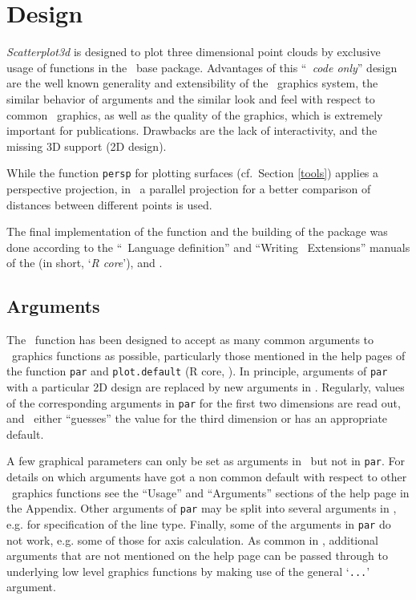 \section{Design\label{design}}
\emph{Scatterplot3d} is designed to plot three dimensional point clouds
by exclusive usage of functions in the \RR\ base package.
Advantages of this ``\emph{\RR\ code only}'' design are the well known
generality and extensibility of the \RR\ graphics system, the similar
behavior of arguments and the similar look and feel with respect to common
\RR\ graphics, as well as the quality of the graphics, which is extremely
important for publications.
Drawbacks are the lack of interactivity, and the missing 3D support (2D
design).

While the function {\tt persp} for plotting surfaces (cf.\ Section
\ref{tools}) applies a perspective projection, in \sdd\ a parallel
projection for a better comparison of distances between different points
is used.

The final implementation of the function and the building of the package
was done according to the ``\RR\ Language definition'' and ``Writing \RR\ Extensions''
manuals of the  (in short, `\emph{R core}'),
 and .

\enlargethispage{10mm}

\subsection{Arguments\label{arguments}}
The \sdd\ function has been designed to accept as many common arguments to
\RR\ graphics functions as possible, particularly those mentioned in the help
pages of the function {\tt par} and {\tt plot.default} (R core, ).
In principle, arguments of {\tt par} with a particular 2D design are
replaced by new arguments in \sdd .
%
Regularly, values of the corresponding arguments in {\tt par} for the first
two dimensions are read out, and \sdd\ either ``guesses'' the value for the
third dimension or has an appropriate default.

A few graphical parameters can only be set as arguments in \sdd\ but not in
{\tt par}.  For details on which arguments have got a non common default
with respect to other \RR\ graphics functions see the ``Usage'' and
``Arguments'' sections of the help page in the Appendix.
%
Other arguments of {\tt par} may be split into several arguments in \sdd
, e.g. for specification of the line type.  Finally, some of the arguments
in {\tt par} do not work, e.g. some of those for axis calculation.  As
common in \RR , additional arguments that are not mentioned on the help
page can be passed through to underlying low level graphics functions by
making use of the general `\texttt{...}' argument.


